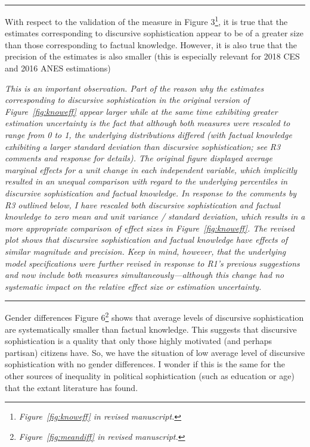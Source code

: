 
\rule{\linewidth}{.01cm}

With respect to the validation of the measure in Figure 3\footnote{\textit{Figure~\ref{fig:knoweff} in revised manuscript.}}, it is true that the estimates corresponding to discursive sophistication appear to be of a greater size than those corresponding to factual knowledge. However, it is also true that the precision of the estimates is also smaller (this is especially relevant for 2018 CES and 2016 ANES estimations)

\textit{This is an important observation. Part of the reason why the estimates corresponding to discursive sophistication in the original version of Figure~\ref{fig:knoweff} appear larger while at the same time exhibiting greater estimation uncertainty is the fact that although both measures were rescaled to range from 0 to 1, the underlying distributions differed (with factual knowledge exhibiting a larger standard deviation than discursive sophistication; see R3 comments and response for details). The original figure displayed average marginal effects for a unit change in each independent variable, which implicitly resulted in an unequal comparison with regard to the underlying percentiles in discursive sophistication and factual knowledge. In response to the comments by R3 outlined below, I have rescaled both discursive sophistication and factual knowledge to zero mean and unit variance / standard deviation, which results in a more appropriate comparison of effect sizes in Figure~\ref{fig:knoweff}. The revised plot shows that discursive sophistication and factual knowledge have effects of similar magnitude and precision. Keep in mind, however, that the underlying model specifications were further revised in response to R1's previous suggestions and now include both measures simultaneously---although this change had no systematic impact on the relative effect size or estimation uncertainty.}


\rule{\linewidth}{.01cm}

Gender differences Figure 6\footnote{\textit{Figure~\ref{fig:meandiff} in revised manuscript.}} shows that average levels of discursive sophistication are systematically smaller than factual knowledge. This suggests that discursive sophistication is a quality that only those highly motivated (and perhaps partisan) citizens have. So, we have the situation of low average level of discursive sophistication with no gender differences. I wonder if this is the same for the other sources of inequality in political sophistication (such as education or age) that the extant literature has found.

